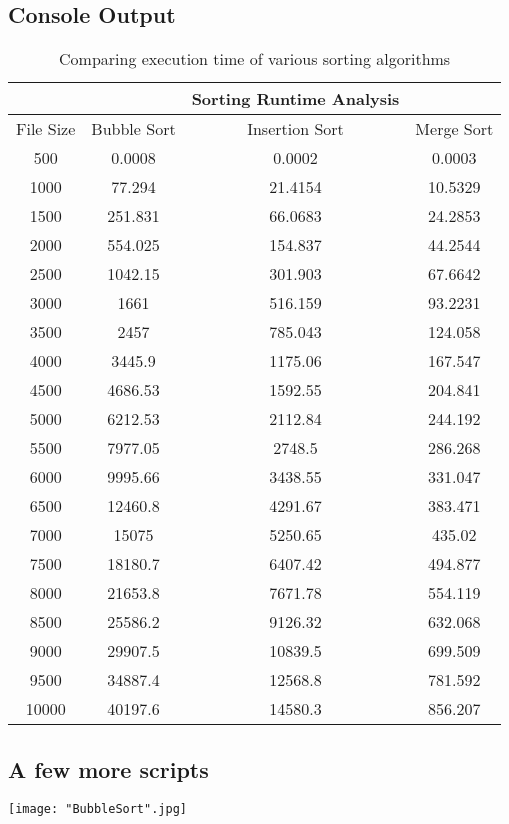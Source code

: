 \documentclass[a4paper, 12pt]{article}
\begin{document}
	\subsection*{Console Output}
	\begin{table}[H]
		\begin{center}
			\begin{tabular}{|cccc|}
			\hline
			&&Sorting Runtime Analysis&\\\hline File Size	& Bubble Sort &	Insertion Sort & Merge Sort\\
500 &	0.0008 &	0.0002 &	0.0003\\
1000 &	77.294 &	21.4154 &	10.5329\\
1500 &	251.831 &	66.0683 &	24.2853\\
2000 &	554.025 &	154.837 &	44.2544\\
2500 &	1042.15 &	301.903 &	67.6642\\
3000 &	1661 &	516.159 &	93.2231\\
3500 &	2457 &	785.043 &	124.058\\
4000 &	3445.9 &	1175.06 &	167.547\\
4500 &	4686.53 &	1592.55 &	204.841\\
5000 &	6212.53 &	2112.84 &	244.192\\
5500 &	7977.05	& 2748.5 &	286.268\\
6000 &	9995.66	& 3438.55 &	331.047\\
6500 &	12460.8	& 4291.67 &	383.471\\
7000 &	15075	& 5250.65 &	435.02 \\
7500 &	18180.7	& 6407.42 &	494.877\\
8000 &	21653.8	& 7671.78 &	554.119\\
8500 &	25586.2	& 9126.32 &	632.068\\
9000 &	29907.5	& 10839.5 &	699.509\\
9500 &	34887.4	& 12568.8 &	781.592\\
10000 &	40197.6	& 14580.3 &	856.207\\\hline
 
			\end{tabular}
			\caption{Comparing execution time of various sorting algorithms}\label{Table 2}
		\end{center}
	\end{table}
	
	\subsection*{A few more scripts}
	\begin{center}
		\texttt{[image: "BubbleSort".jpg]}
	\end{center}
	
\end{document}
